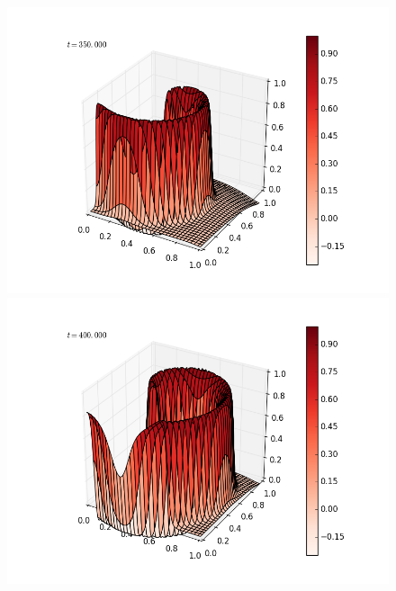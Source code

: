 \documentclass[12pt]{article}
\begin{document}
\begin{figure}[H]
\includegraphics[scale=0.4]{partc_fast_frames/partc_fast_fig17.png}
\includegraphics[scale=0.4]{partc_fast_frames/partc_fast_fig19.png}
\end{figure}
\end{document}
